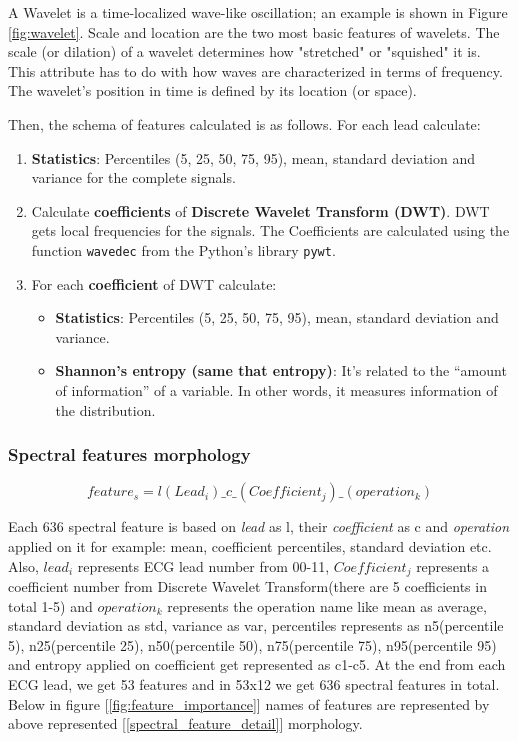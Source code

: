 A Wavelet is a time-localized wave-like oscillation; an example is shown in Figure \ref{fig:wavelet}. Scale and location are the two most basic features of wavelets. The scale (or dilation) of a wavelet determines how "stretched" or "squished" it is. This attribute has to do with how waves are characterized in terms of frequency. The wavelet's position in time is defined by its location (or space).

Then, the schema of features calculated is as follows. For each lead calculate:

\begin{enumerate}
    \item \textbf{Statistics}: Percentiles (5, 25, 50, 75, 95), mean, standard deviation and variance for the complete signals.
    
    \item Calculate \textbf{coefficients} of \textbf{Discrete Wavelet Transform (DWT)}. DWT gets local frequencies for the signals. The Coefficients are calculated using the function \texttt{wavedec} from the Python’s library \texttt{pywt}.
    
    \item For each \textbf{coefficient} of DWT calculate:
    \begin{itemize}
        \item \textbf{Statistics}: Percentiles (5, 25, 50, 75, 95), mean, standard deviation and variance.
        
        \item \textbf{Shannon’s entropy (same that entropy)}: It’s related to the “amount of information” of a variable. In other words, it measures information of the distribution.
    \end{itemize}
\end{enumerate}


\subsubsection{Spectral features morphology}

\begin{equation} \label{spectral_feature_detail}
feature_s = l(Lead_i)\_c\_(Coefficient_j)\_(operation_k)
\end{equation}

Each 636 spectral feature is based on \textit{lead} as l, their \textit{coefficient} as c and \textit{operation} applied on it for example: mean, coefficient percentiles, standard deviation etc. Also, $lead_i$ represents ECG lead number from 00-11, $Coefficient_j$ represents a coefficient number from Discrete Wavelet Transform(there are 5 coefficients in total 1-5) and $operation_k$ represents the operation name like mean as average, standard deviation as std, variance as var, percentiles represents as n5(percentile 5), n25(percentile 25), n50(percentile 50), n75(percentile 75), n95(percentile 95) and entropy applied on coefficient get represented as c1-c5. At the end from each ECG lead, we get 53 features and in 53x12 we get 636 spectral features in total. Below in figure [\ref{fig:feature_importance}] names of features are represented by above represented [\ref{spectral_feature_detail}] morphology. 


